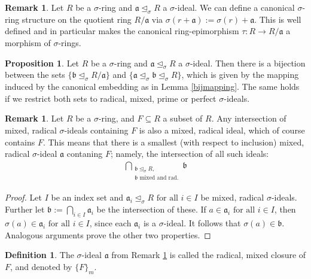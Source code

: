 \documentclass{article}
\def\a{\mathfrak{a}}
\def\b{\mathfrak{b}}
\def\s{\sigma}
\def\si{\unlhd_{\sigma}}
\def\fa{\text{ for all }}
\newenvironment{bew}{\begin{proof}[Proof]}{\end{proof}}
\theoremstyle{definition}
\newtheorem{prop}[Satz]{Proposition}
\newtheorem{rem}[Satz]{Remark}
\newtheorem{defn}[Satz]{Definition}
\begin{document}
\begin{rem}
Let $R$ be a $\s$-ring and $\a \si R$ a $\s$-ideal. We can define a canonical $\s$-ring structure on the quotient ring $R/\a$ via $\s(r+\a):= \s(r) + \a$. 
This is well defined and in particular makes the canonical ring-epimorphism $\tau: R \rightarrow R/\a$ a morphism of $\s$-rings.
\end{rem}

\begin{prop}\label{bijideals}
Let $R$ be a $\s$-ring and $\a \si R$ a $\s$-ideal. Then there is a bijection between the sets $\{ \b \si R/\a \}$ and $\{ \a \si \b \si R \}$, which is given by the mapping induced by the canonical embedding as in Lemma \ref{bijmapping}. The same holds if we restrict both sets to radical, mixed, prime or perfect $\s$-ideals.
\end{prop}

\begin{rem}\label{wmwelldef}
Let $R$ be a $\s$-ring, and $F \subseteq R$ a subset of $R$. Any intersection of mixed, radical $\s$-ideals containing $F$ is also a mixed, radical ideal, which of course contains $F$. 
This means that there is a smallest (with respect to inclusion) mixed, radical $\s$-ideal $\a$ contaning $F$; namely, the intersection of all such ideals:
\begin{align*} \bigcap_{\substack{ \b \si R, \\ \b \text{ mixed and rad.}}} \b \end{align*}
\begin{proof}
Let $I$ be an index set and $\a_i \si R \fa i \in I$ be mixed, radical $\s$-ideals. Further let $\b := \bigcap_{i \in I} \a_i$ be the intersection of these. If $a \in \a_i \fa i \in I$, then $\s(a) \in \a_i \fa i \in I$, since each $\a_i$ is a $\s$-ideal.
It follows that $\s(a) \in \b$. Analogous arguments prove the other two properties.
\end{proof}
\end{rem}

\begin{defn}
The $\s$-ideal $\a$ from Remark \ref{wmwelldef} is called the radical, mixed closure of $F$, and denoted by $\{F\}_{m}$.
\end{defn}
\end{document}
